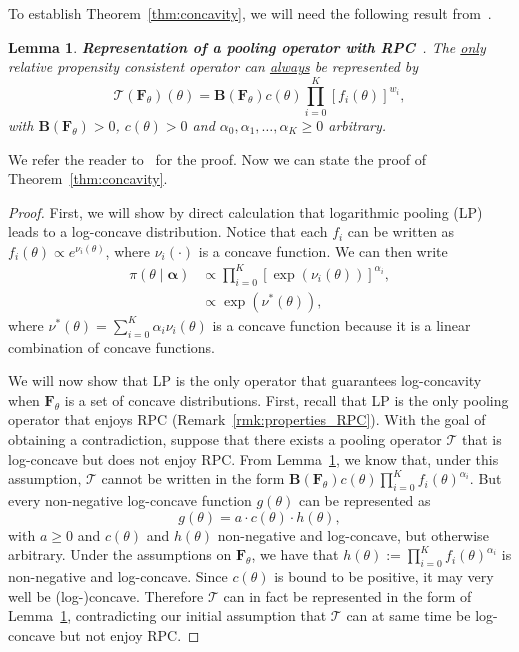 \documentclass[a4paper, notitlepage, 10pt]{article}
\newtheorem{lemma}{Lemma}[]
\begin{document}
To establish Theorem~\ref{thm:concavity}, we will need the following result from~\cite{Genest1984}.
\begin{lemma}
\label{lem:RPC_representation}
\textbf{Representation of a pooling operator with RPC}~\citep[eq. 3.1]{Genest1984}.
The \underline{only} relative propensity consistent operator can \underline{always} be represented by
\[ \mathcal{T} \left( \boldsymbol F_\theta \right)(\theta) = \boldsymbol B\left( \boldsymbol F_\theta \right) c(\theta) \prod_{i=0}^K \left[f_i(\theta) \right]^{w_i},\]
with $\boldsymbol B\left( \boldsymbol F_\theta \right) > 0$, $c(\theta) >0$  and $\alpha_0, \alpha_1, \ldots, \alpha_K \geq 0$ arbitrary. 
\end{lemma}
We refer the reader to~\cite{Genest1984} for the proof.
Now we can state the proof of Theorem~\ref{thm:concavity}.
\begin{proof}
First, we will show by direct calculation that logarithmic pooling (LP) leads to a log-concave distribution.
Notice that each $f_i$ can be written as $ f_i(\theta) \propto e^{\nu_i(\theta)}$, where $\nu_i(\cdot)$ is a concave function.
We can then write
\begin{align*}
 \pi(\theta \mid \boldsymbol \alpha) &\propto \prod_{i=0}^{K} [\exp(\nu_i(\theta))]^{\alpha_i},\\
             &\propto \exp(\nu^{\ast}(\theta)),
\end{align*}
 where $\nu^{\ast}(\theta) = \sum_{i=0}^{K}\alpha_i\nu_i(\theta)$ is a concave function because it is a linear combination of concave functions.
 
We will now show that LP is the only operator that guarantees log-concavity when $\boldsymbol F_\theta$ is a set of concave distributions.
First, recall that LP is the only pooling operator that enjoys RPC (Remark~\ref{rmk:properties_RPC}).
With the goal of obtaining a contradiction, suppose that there exists a pooling operator $\mathcal{T}$ that is log-concave but does not enjoy RPC.
 From Lemma~\ref{lem:RPC_representation}, we know that, under this assumption, $\mathcal{T}$ cannot be written in the form $\boldsymbol B(\boldsymbol F_\theta) c(\theta) \prod_{i=0}^K f_i(\theta)^{\alpha_i} $.
But every non-negative log-concave function $g(\theta)$ can be represented as
 \begin{equation}
 \label{eq:lc_rep}
  g(\theta) = a \cdot c(\theta) \cdot h(\theta),
 \end{equation}
with $a \geq 0$ and $c(\theta)$ and $h(\theta)$ non-negative and log-concave, but otherwise arbitrary.
Under the assumptions on $\boldsymbol F_\theta$, we have that $h(\theta) := \prod_{i=0}^K f_i(\theta)^{\alpha_i}$ is non-negative and log-concave.
Since $c(\theta)$ is bound to be positive, it may very well be (log-)concave.
Therefore $\mathcal{T}$ can in fact be represented in the form of Lemma~\ref{lem:RPC_representation}, contradicting our initial assumption that $\mathcal{T}$ can at same time be log-concave but not enjoy RPC.  
\end{proof}
\end{document}
